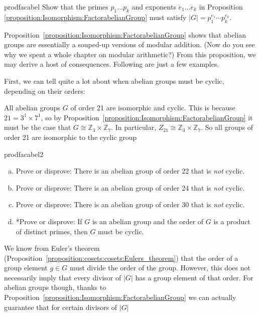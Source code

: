 \begin{exercise}{prodfacabel}
Show that the primes  $p_1 \ldots p_k$ and exponents $e_1 \ldots e_k$ in Proposition~ \ref{proposition:Isomorphism:FactorabelianGroup} must satisfy
$|G| = p_1^{e_1} \cdots p_k^{e_k}$.
\end{exercise}

Proposition~\ref{proposition:Isomorphism:FactorabelianGroup} shows that abelian groups are essentially a souped-up versions of modular addition.  (Now do you see why we spent a whole chapter on modular arithmetic?) From this proposition, we may derive a host of consequences.  Following are just a few examples.

First, we can tell quite a lot about when abelian groups must be cyclic, depending on their orders:

\begin{example}{}  All abelian groups $G$ of order 21 are isomorphic and cyclic. This is because $21 = 3^1 \times 7^1$, so by Proposition~\ref{proposition:Isomorphism:FactorabelianGroup} it must be the case that $G \cong {\mathbb Z}_3 \times {\mathbb Z}_7$. In particular,
 $Z_{21}  \cong {\mathbb Z}_3 \times {\mathbb Z}_7$. So all groups of order 21 are isomorphic to the cyclic group 
\end{example}

\begin{exercise}{prodfacabel2}
\begin{enumerate}[(a)] 
\item
Prove or disprove: There is an abelian group of order 22 that is \emph{not} cyclic. 
\item
Prove or disprove: There is an abelian group of order 24 that is \emph{not} cyclic. 
\item
Prove or disprove: There is an abelian group of order 30 that is \emph{not} cyclic.
\item
*Prove or disprove:  If $G$ is an abelian group and the order of $G$ is a product of distinct primes, then $G$ must be cyclic.
\end{enumerate}
\end{exercise}

We know from Euler's theorem (Proposition~\ref{proposition:cosets:cosets:Eulers_theorem}) that the order of a group element $g \in G$ must divide the order of the group. However, this does not necessarily imply that every divisor of $|G|$ has a group element of that order.  For abelian groups though, 
thanks to  Proposition~\ref{proposition:Isomorphism:FactorabelianGroup} we can actually guarantee that for certain divisors of $|G|$

